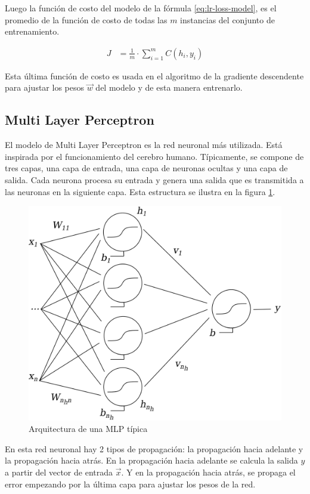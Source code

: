 Luego la función de costo del modelo de la fórmula \ref{eq:lr-loss-model}, es el promedio de la función de costo de todas las $m$ instancias del conjunto de entrenamiento.

\begin{equation}
	\label{eq:lr-loss-model}
\begin{split}
	J &= \frac{1}{m} \cdot \sum_{i=1}^{m} {C(h_i, y_i)}
\end{split}
\end{equation}

Esta última función de costo es usada en el algoritmo de la gradiente descendente \citep{curry1944method} para ajustar los pesos $\vec{w}$ del modelo y de esta manera entrenarlo.

\subsection{Multi Layer Perceptron}

El modelo de Multi Layer Perceptron es la red neuronal más utilizada. Está inspirada por el funcionamiento del cerebro humano. Típicamente, se compone de tres capas, una capa de entrada, una capa de neuronas ocultas y una capa de salida. Cada neurona procesa su entrada y genera una salida que es transmitida a las neuronas en la siguiente capa. Esta estructura se ilustra en la figura \ref{fig:mlp-eg}.

\begin{figure}[htbp]
	\centering
	\includegraphics[width=0.6\linewidth]{graficos/propios/mlp.png}
	\caption{Arquitectura de una MLP típica \citep{bouzgou2012advanced}}
	\label{fig:mlp-eg}
\end{figure}

En esta red neuronal hay 2 tipos de propagación: la propagación hacia adelante y la propagación hacia atrás. En la propagación hacia adelante se calcula la salida $y$ a partir del vector de entrada $\vec{x}$. Y en la propagación hacia atrás, se propaga el error empezando por la última capa para ajustar los pesos de la red.

